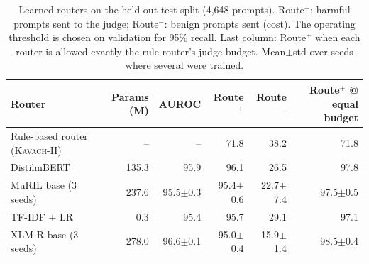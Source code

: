 \begin{table}[t]\centering\small
\caption{Learned routers on the held-out test split (4{,}648 prompts). Route$^{+}$: harmful prompts sent to the judge; Route$^{-}$: benign prompts sent (cost). The operating threshold is chosen on validation for 95\% recall. Last column: Route$^{+}$ when each router is allowed exactly the rule router's judge budget. Mean$\pm$std over seeds where several were trained.}\label{tab:router}
\begin{tabular}{lrrrrr}
\toprule
Router & Params (M) & AUROC & Route$^{+}$ & Route$^{-}$ & Route$^{+}$ @ equal budget \\
\midrule
Rule-based router (\textsc{Kavach}-H) & -- & -- & 71.8 & 38.2 & 71.8 \\
DistilmBERT & 135.3 & 95.9 & 96.1 & 26.5 & 97.8 \\
MuRIL base (3 seeds) & 237.6 & 95.5$\pm$0.3 & 95.4$\pm$0.6 & 22.7$\pm$7.4 & 97.5$\pm$0.5 \\
TF-IDF + LR & 0.3 & 95.4 & 95.7 & 29.1 & 97.1 \\
XLM-R base (3 seeds) & 278.0 & 96.6$\pm$0.1 & 95.0$\pm$0.4 & 15.9$\pm$1.4 & 98.5$\pm$0.4 \\
\bottomrule
\end{tabular}
\end{table}
